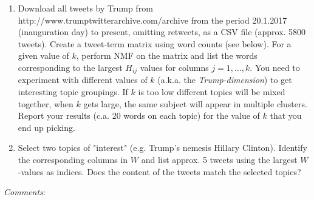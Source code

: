 \documentclass[11pt]{article}
\begin{document}
\begin{enumerate}
\def\labelenumi{\alph{enumi})}
\item
  Download all tweets by Trump from
  http://www.trumptwitterarchive.com/archive from the period 20.1.2017
  (inauguration day) to present, omitting retweets, as a CSV file
  (approx. 5800 tweets). Create a tweet-term matrix using word counts
  (see below). For a given value of \(k\), perform NMF on the matrix and
  list the words corresponding to the largest \(H_{ij}\) values for
  columns \(j=1,\ldots,k\). You need to experiment with different values
  of \(k\) (a.k.a. the \emph{Trump-dimension}) to get interesting topic
  groupings. If \(k\) is too low different topics will be mixed
  together, when \(k\) gets large, the same subject will appear in
  multiple clusters. Report your results (c.a. 20 words on each topic)
  for the value of \(k\) that you end up picking.
\item
  Select two topics of "interest" (e.g. Trump's nemesis Hillary
  Clinton). Identify the corresponding columns in \(W\) and list approx.
  5 tweets using the largest \(W\)-values as indices. Does the content
  of the tweets match the selected topics?
\end{enumerate}

\emph{Comments}:
\end{document}
